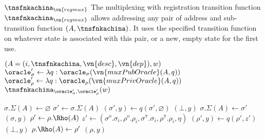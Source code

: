 \begin{transitionfn}{$\tnsfnkachina_{\vn{regmux}}$}
  The multiplexing with registration transition function
  $\tnsfnkachina_{\vn{regmux}}$ allows addressing any pair of address and
  sub-transition function $(A, \tnsfnkachina)$. It uses the specified transition
  function on whatever state is associated with this pair, or a new, empty state
  for the first use.

  \begin{pubstatedecl}
  \end{pubstatedecl}%
  \vspace{-1em}
  \begin{privstatedecl}
  \end{privstatedecl}

  \begin{receiveinput*}{$(A = (i, \tnsfnkachina, \vn{desc}, \vn{dep}), w)$}
    \State \Let $\oracle_\sigma' \gets \lambda q :
      \oracle_\sigma(\vn{muxPubOracle}(A, q))$
    \State \Let $\oracle_\rho' \gets \lambda q :
      \oracle_\rho(\vn{muxPrivOracle}(A, q))$
    \State \Return $\tnsfnkachina_{\oracle_\sigma', \oracle_\rho'}(w)$
  \end{receiveinput*}

  \begin{helpers}
        \Let $\sigma.\Sigma(A) \gets \varnothing$
      \EndIf
      \State \Let $\sigma' \gets \sigma.\Sigma(A)$
      \State \Let $(\sigma', y) \gets q(\sigma', \varnothing)$
        \Return $(\bot, y)$
      \Else
        \State \Let $\sigma.\Sigma(A) \gets \sigma'$
        \State \Return $(\sigma, y)$
      \EndIf
    \EndFunction
      \State \Let $\rho' \gets \rho.\Rho(A)$
      \State \Let $z' \gets (\sigma^o.\sigma_i, \rho^o.\rho_i,
        \sigma^\pi.\sigma_i, \rho^\pi.\rho_i, \eta)$
      \State \Let $(\rho', y) \gets q(\rho', z')$
        \Return $(\bot, y)$
      \Else
        \State \Let $\rho.\Rho(A) \gets \rho'$
        \State \Return $(\rho, y)$
      \EndIf
    \EndFunction
  \end{helpers}
\end{transitionfn}

